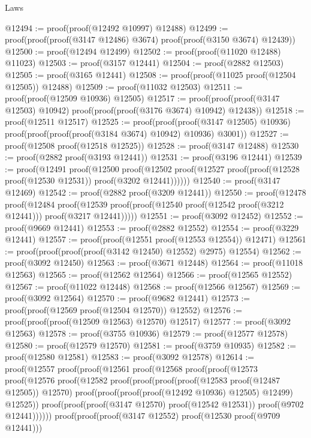 \begin{lexlean}{Laws}
\begin{coremodule}
@12494 := proof(proof(@12492 @10997) @12488)
@12499 := proof(proof(proof(@3147 @12486) @3674) proof(proof(@3150 @3674) @12439))
@12500 := proof(@12494 @12499)
@12502 := proof(proof(@11020 @12488) @11023)
@12503 := proof(@3157 @12441)
@12504 := proof(@2882 @12503)
@12505 := proof(@3165 @12441)
@12508 := proof(proof(@11025 proof(@12504 @12505)) @12488)
@12509 := proof(@11032 @12503)
@12511 := proof(proof(@12509 @10936) @12505)
@12517 := proof(proof(proof(@3147 @12503) @10942) proof(proof(proof(@3176 @3674) @10942) @12438))
@12518 := proof(@12511 @12517)
@12525 := proof(proof(proof(@3147 @12505) @10936)
      proof(proof(proof(proof(@3184 @3674) @10942) @10936) @3001))
@12527 := proof(@12508 proof(@12518 @12525))
@12528 := proof(@3147 @12488)
@12530 := proof(@2882 proof(@3193 @12441))
@12531 := proof(@3196 @12441)
@12539 := proof(@12491
      proof(@12500
          proof(@12502
              proof(@12527 proof(proof(@12528 proof(@12530 @12531)) proof(@3202 @12441))))))
@12540 := proof(@3147 @12469)
@12542 := proof(@2882 proof(@3209 @12441))
@12550 := proof(@12478
      proof(@12484
          proof(@12539 proof(proof(@12540 proof(@12542 proof(@3212 @12441))) proof(@3217 @12441)))))
@12551 := proof(@3092 @12452)
@12552 := proof(@9669 @12441)
@12553 := proof(@2882 @12552)
@12554 := proof(@3229 @12441)
@12557 := proof(proof(@12551 proof(@12553 @12554)) @12471)
@12561 := proof(proof(proof(proof(@3142 @12450) @12552) @2975) @12554)
@12562 := proof(@3092 @12450)
@12563 := proof(@3671 @12448)
@12564 := proof(@11018 @12563)
@12565 := proof(@12562 @12564)
@12566 := proof(@12565 @12552)
@12567 := proof(@11022 @12448)
@12568 := proof(@12566 @12567)
@12569 := proof(@3092 @12564)
@12570 := proof(@9682 @12441)
@12573 := proof(proof(@12569 proof(@12504 @12570)) @12552)
@12576 := proof(proof(proof(@12509 @12563) @12570) @12517)
@12577 := proof(@3092 @12563)
@12578 := proof(@3755 @10936)
@12579 := proof(@12577 @12578)
@12580 := proof(@12579 @12570)
@12581 := proof(@3759 @10935)
@12582 := proof(@12580 @12581)
@12583 := proof(@3092 @12578)
@12614 := proof(@12557
      proof(proof(@12561
            proof(@12568
                proof(proof(@12573
                      proof(@12576
                          proof(@12582
                              proof(proof(proof(proof(@12583 proof(@12487 @12505)) @12570)
                                    proof(proof(proof(proof(@12492 @10936) @12505) @12499) @12525))
                                  proof(proof(proof(@3147 @12570) proof(@12542 @12531))
                                      proof(@9702 @12441))))))
                    proof(proof(proof(@3147 @12552) proof(@12530 proof(@9709 @12441)))

\end{coremodule}
\end{lexlean}
